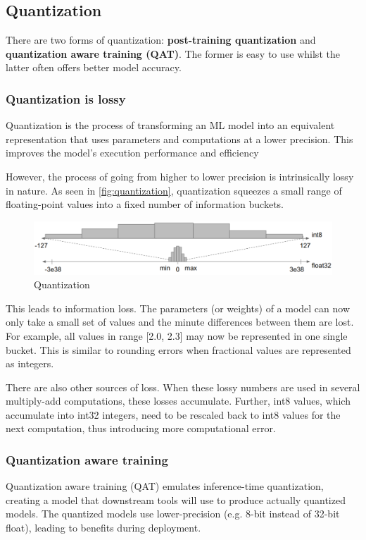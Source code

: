 \subsection{Quantization}
There are two forms of quantization: \textbf{post-training quantization} and
\textbf{quantization aware training (QAT)}. The former is easy to use whilst
the latter often offers better model accuracy.

\subsubsection{Quantization is lossy}
Quantization is the process of transforming an ML model into an equivalent
representation that uses parameters and computations at a lower precision.
This improves the model's execution performance and efficiency

However, the process of going from higher to lower precision is intrinsically
lossy in nature. As seen in \autoref{fig:quantization}, quantization squeezes
a small range of floating-point values into a fixed number of information
buckets.

\begin{figure}[ht]
    \includegraphics[width=\textwidth]{images/introduction/quantization.png}
    \centering
    \caption{Quantization}\label{fig:quantization}
\end{figure}

This leads to information loss. The parameters (or weights) of a model can now
only take a small set of values and the minute differences between them are
lost. For example, all values in range [2.0, 2.3] may now be represented in one
single bucket. This is similar to rounding errors when fractional values are
represented as integers.

There are also other sources of loss. When these lossy numbers are used in
several multiply-add computations, these losses accumulate. Further, int8
values, which accumulate into int32 integers, need to be rescaled back to int8
values for the next computation, thus introducing more computational
error.~\cite{tfmot:quantization_blog}

\subsubsection{Quantization aware training}
Quantization aware training (QAT) emulates inference-time quantization,
creating a model that downstream tools will use to produce actually quantized
models. The quantized models use lower-precision (e.g. 8-bit instead of 32-bit
float), leading to benefits during deployment.

